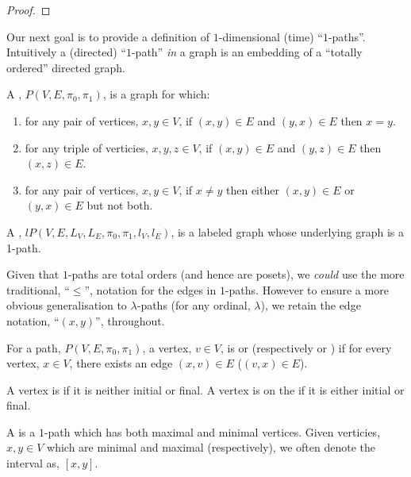 \begin{proof}
\end{proof}


Our next goal is to provide a definition of $1$-dimensional (time) ``$1$-paths''.
Intuitively a (directed) ``$1$-path'' \emph{in} a graph is an embedding of a ``totally
ordered'' directed graph.


\begin{definition}
A , $P(V, E, \pi_0, \pi_1)$, is a graph for which:

\begin{enumerate}
\item {} for any pair of vertices, $x, y \in V$, if $(x,y) \in E$ and
$(y,x) \in E$ then $x = y$.
\item {} for any triple of verticies, $x, y, z \in V$, 
if $(x,y) \in E$ and $(y,z) \in E$ then $(x,z) \in E$.
\item {} for any pair of vertices, $x, y \in V$, if $x \neq y$ then
either $(x,y) \in E$ or $(y,x) \in E$ but not both.
\end{enumerate}

A , $lP(V, E, L_V, L_E, \pi_0, \pi_1, l_V, l_E)$, is a labeled 
graph whose underlying graph is a 1-path.
\end{definition}

Given that $1$-paths are total orders (and hence are posets), we \emph{could} use the more
traditional, ``$\leq$'', notation for the edges in $1$-paths. However to ensure a more
obvious generalisation to $\lambda$-paths (for any ordinal, $\lambda$), we retain the edge
notation, ``$(x,y)$'', throughout.

\begin{definition}
For a path, $P(V, E, \pi_0, \pi_1)$, a vertex, $v \in V$, is  or
 (respectively  or ) if for every
vertex, $x \in V$, there exists an edge $(x,v) \in E$ ($(v, x) \in E$).

A vertex is  if it is neither initial or final. A vertex is on the  
 if it is either initial or final.

A  is a $1$-path which has both maximal and minimal vertices. Given 
verticies, $x, y \in V$ which are minimal and maximal (respectively), we often denote the 
interval as, $[x,y]$.
\end{definition}

